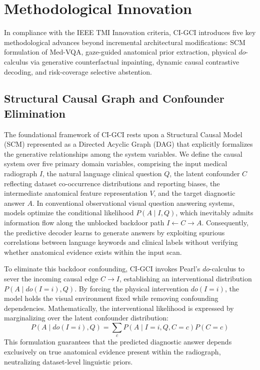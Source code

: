 \documentclass[journal]{IEEEtran}
\begin{document}
\section{Methodological Innovation}
In compliance with the IEEE TMI Innovation criteria, CI-GCI introduces five key methodological advances beyond incremental architectural modifications: SCM formulation of Med-VQA, gaze-guided anatomical prior extraction, physical $do$-calculus via generative counterfactual inpainting, dynamic causal contrastive decoding, and risk-coverage selective abstention.

\subsection{Structural Causal Graph and Confounder Elimination}
The foundational framework of CI-GCI rests upon a Structural Causal Model (SCM) represented as a Directed Acyclic Graph (DAG) that explicitly formalizes the generative relationships among the system variables. We define the causal system over five primary domain variables, comprising the input medical radiograph $I$, the natural language clinical question $Q$, the latent confounder $C$ reflecting dataset co-occurrence distributions and reporting biases, the intermediate anatomical feature representation $V$, and the target diagnostic answer $A$. In conventional observational visual question answering systems, models optimize the conditional likelihood $P(A \mid I, Q)$, which inevitably admits information flow along the unblocked backdoor path $I \leftarrow C \rightarrow A$. Consequently, the predictive decoder learns to generate answers by exploiting spurious correlations between language keywords and clinical labels without verifying whether anatomical evidence exists within the input scan.

To eliminate this backdoor confounding, CI-GCI invokes Pearl's $do$-calculus to sever the incoming causal edge $C \rightarrow I$, establishing an interventional distribution $P(A \mid do(I=i), Q)$. By forcing the physical intervention $do(I=i)$, the model holds the visual environment fixed while removing confounding dependencies. Mathematically, the interventional likelihood is expressed by marginalizing over the latent confounder distribution:
\begin{equation}
P(A \mid do(I=i), Q) = \sum_{c} P(A \mid I=i, Q, C=c) P(C=c)
\end{equation}
This formulation guarantees that the predicted diagnostic answer depends exclusively on true anatomical evidence present within the radiograph, neutralizing dataset-level linguistic priors.
\end{document}
